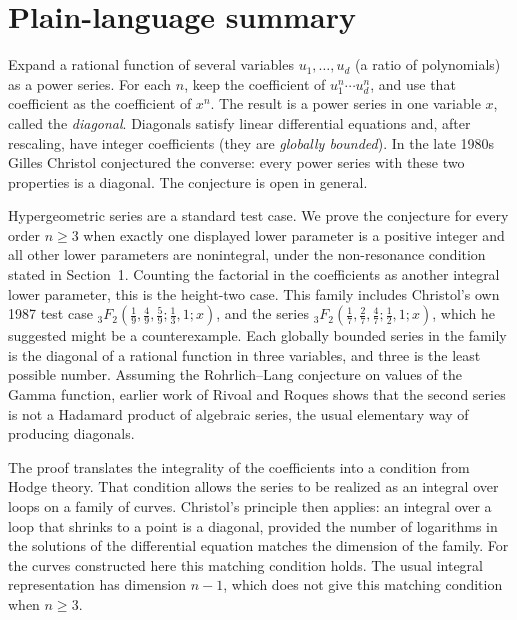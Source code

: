 \documentclass[11pt]{amsart}
\theoremstyle{definition}
\theoremstyle{remark}
\numberwithin{equation}{section}
\begin{document}
\maketitle

\section*{Plain-language summary}

Expand a rational function of several variables $u_1,\dots,u_d$ (a ratio of polynomials) as a power series. For each $n$, keep the coefficient of $u_1^n\cdots u_d^n$, and use that coefficient as the coefficient of $x^n$. The result is a power series in one variable $x$, called the \emph{diagonal}. Diagonals satisfy linear differential equations and, after rescaling, have integer coefficients (they are \emph{globally bounded}). In the late 1980s Gilles Christol conjectured the converse: every power series with these two properties is a diagonal. The conjecture is open in general.

Hypergeometric series are a standard test case. We prove the conjecture for every order $n\ge3$ when exactly one displayed lower parameter is a positive integer and all other lower parameters are nonintegral, under the non-resonance condition stated in Section~1. Counting the factorial in the coefficients as another integral lower parameter, this is the height-two case. This family includes Christol's own 1987 test case ${}_3F_2(\frac19,\frac49,\frac59;\frac13,1;x)$, and the series ${}_3F_2(\frac17,\frac27,\frac47;\frac12,1;x)$, which he suggested might be a counterexample. Each globally bounded series in the family is the diagonal of a rational function in three variables, and three is the least possible number. Assuming the Rohrlich--Lang conjecture on values of the Gamma function, earlier work of Rivoal and Roques shows that the second series is not a Hadamard product of algebraic series, the usual elementary way of producing diagonals.

The proof translates the integrality of the coefficients into a condition from Hodge theory. That condition allows the series to be realized as an integral over loops on a family of curves. Christol's principle then applies: an integral over a loop that shrinks to a point is a diagonal, provided the number of logarithms in the solutions of the differential equation matches the dimension of the family. For the curves constructed here this matching condition holds. The usual integral representation has dimension $n-1$, which does not give this matching condition when $n\ge3$.
\end{document}
